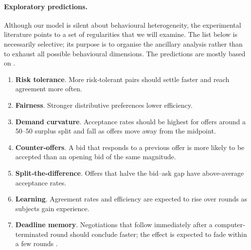 \paragraph{Exploratory predictions.}
Although our model is silent about behavioural heterogeneity, the experimental
literature points to a set of regularities that we will examine.  The list
below is necessarily selective; its purpose is to organise the ancillary
analysis rather than to exhaust all possible behavioural dimensions. The predictions are mostly based on \citet{bochet_beyond_2024}.

\begin{enumerate}[label=\textbf{E\arabic*},leftmargin=1.4cm]
  \item \textbf{Risk tolerance}.  More risk‐tolerant pairs should settle faster
        and reach agreement more often.
  \item \textbf{Fairness}.  Stronger distributive preferences
        lower efficiency.
  \item \textbf{Demand curvature}.  Acceptance rates should be highest for offers around a 50–50 surplus split and fall as offers move away from the midpoint.
  \item \textbf{Counter‐offers}.  A bid that responds to a previous offer is
        more likely to be accepted than an opening bid of the same magnitude.
  \item \textbf{Split‐the‐difference}.  Offers that halve the
        bid–ask gap have above‐average acceptance rates.
  \item \textbf{Learning}.  Agreement rates and efficiency are expected to rise
        over rounds as subjects gain experience.
  \item \textbf{Deadline memory}.  Negotiations that follow immediately after a
        computer‐terminated round should conclude faster; the effect is
        expected to fade within a few rounds \citep{enke2024associative}.
\end{enumerate}






